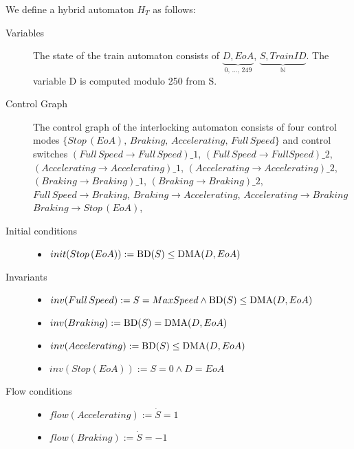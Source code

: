 \begin{mydef}
We define a hybrid automaton $H_{T}$ as follows:
\begin{description}
\item[Variables] The state of the train automaton consists of $\underbrace{D, EoA}_\text{0, \ldots , 249}$, \newline $\underbrace{S, TrainID}_{\mathbb{N}}$. The variable D is computed modulo 250 from S.

\item[Control Graph] The control graph of the interlocking automaton consists of four control modes $\{Stop \, (EoA), \, Braking, \, Accelerating, \, Full \,  Speed \}$ and control switches $(Full \, Speed \to  Full \, Speed)\_1$, $(Full \, Speed \to Full Speed)\_2$, $(Accelerating \to Accelerating)\_1$, $(Accelerating \to Accelerating)\_2$, $(Braking \to Braking)\_1$, $(Braking \to Braking)\_2$,  $Full \, Speed \to Braking$, $Braking \to Accelerating$, $Accelerating \to Braking$  $Braking \to Stop \, (EoA)$, 

\item[Initial conditions] \hspace*{0mm}
\begin{itemize} 
	\item $init(Stop \, (EoA)) :=   \mathrm{BD}(S) \leq \mathrm{DMA}(D,EoA)  $
\end{itemize}

\item[Invariants] \hspace*{0mm}
	\begin{itemize}
	\item $inv(Full \, Speed) :=   S = MaxSpeed \wedge \mathrm{BD}(S) \leq \mathrm{DMA}(D,EoA)$ 

	\item $inv(Braking)  :=  \mathrm{BD}(S) = \mathrm{DMA}(D,EoA)$
         \item $inv(Accelerating) := \mathrm{BD}(S) \leq \mathrm{DMA}(D,EoA)$

	\item $inv(Stop (EoA)) := S = 0 \wedge D = EoA$ 
	\end{itemize}
             
\item[Flow conditions] \hspace*{0mm}
	\begin{itemize}
	\item $flow(Accelerating):= \dot{S} = 1$ 
	
	\item $flow(Braking) := \dot{S} = -1$


\end{itemize}
\end{description}
\end{mydef}
